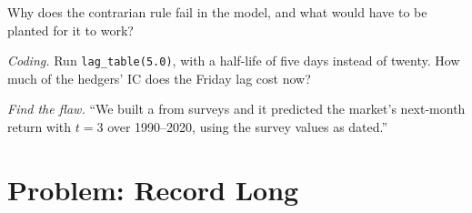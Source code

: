 \begin{exercise}[$\star\star$]\label{exo:s1:positioning-and-sentiment:6}
Why does the contrarian rule fail in the model, and what would have to be planted for it to work?
\end{exercise}

\begin{exercise}[$\star\star\star$]\label{exo:s1:positioning-and-sentiment:7}
\emph{Coding.} Run \texttt{lag\_table(5.0)}, with a half-life of five days instead of twenty. How much of the hedgers' IC does the Friday lag
cost now?
\end{exercise}

\begin{exercise}[$\star\star\star$]\label{exo:s1:positioning-and-sentiment:8}
\emph{Find the flaw.} ``We built a  from surveys and it predicted the market's next-month return with $t = 3$ over 1990--2020, using
the survey values as dated.''
\end{exercise}

\section{Problem: Record Long}

